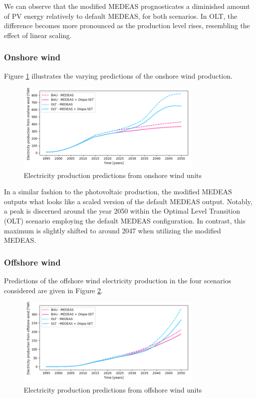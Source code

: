 We can observe that the modified MEDEAS prognosticates a diminished amount of PV energy relatively to default MEDEAS, for both scenarios. In OLT, the difference becomes more pronounced as the production level rises, resembling the effect of linear scaling.

\subsubsection{Onshore wind}

Figure \ref{fig:electricity-production-onshore} illustrates the varying predictions of the onshore wind production.

\begin{figure}[h]
    \centering
    \includegraphics[width=0.8\textwidth]{resources/images/electricity-production-onshore.png}
    \caption{Electricity production predictions from onshore wind units}
    \label{fig:electricity-production-onshore}
\end{figure}

In a similar fashion to the photovoltaic production, the modified MEDEAS outputs what looks like a scaled version of the default MEDEAS output. Notably, a peak is discerned around the year 2050 within the Optimal Level Transition (OLT) scenario employing the default MEDEAS configuration. In contrast, this maximum is slightly shifted to around 2047 when utilizing the modified MEDEAS. 

\subsubsection{Offshore wind}

Predictions of the offshore wind electricity production in the four scenarios considered are given in Figure \ref{fig:electricity-production-offshore}.

\begin{figure}[h]
    \centering
    \includegraphics[width=0.8\textwidth]{resources/images/electricity-production-offshore.png}
    \caption{Electricity production predictions from offshore wind units}
    \label{fig:electricity-production-offshore}
\end{figure}

